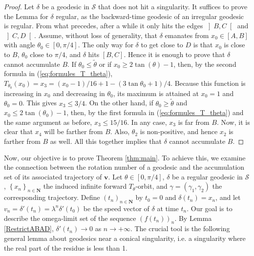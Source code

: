 \documentclass[11pt]{article}
\begin{document}
\begin{proof}
    Let $\delta$ be a geodesic in $\mathcal{S}$ that does not hit a singularity. It suffices to prove the Lemma for $\delta$ regular, as the backward-time geodesic of an irregular geodesic is regular. From what precedes, after a while it only hits the edges $\left]B,C\right[$ and $\left]C,D\right[$. Assume, without loss of generality, that $\delta$ emanates from $x_{0}\in[A,B]$ with angle $\theta_{0}\in[0,\pi/4]$. The only way for $\delta$ to get close to $D$ is that $x_{0}$ is close to $B$, $\theta_{0}$ close to $\pi/4$, and $\delta$ hits $[B,C]$. Hence it is enough to prove that $\delta$ cannot accumulate $B$. If $\theta_{0}\leq\widetilde{\theta}$ or if $x_{0}\geq2\tan(\theta)-1$, then, by the second formula in (\ref{eq:formules_T_theta}), $T_{\theta_{0}}(x_{0})=x_{3}=(x_{0}-1)/16+1-(3\tan\theta_{0}+1)/4$. Because this function is increasing in $x_{0}$ and decreasing in $\theta_{0}$, its maximum is attained at $x_{0}=1$ and $\theta_{0}=0$. This gives $x_{3}\leq3/4$. On the other hand, if $\theta_{0}\geq\widetilde{\theta}$ and $x_{0}\leq2\tan(\theta_{0})-1$, then, by the first formula in (\ref{eq:formules_T_theta}) and the same argument as before, $x_{3}\leq15/16$. In any case, $x_{3}$ is far from $B$. Now, it is clear that $x_{4}$ will be farther from $B$. Also, $\theta_{2}$ is non-positive, and hence $x_{2}$ is farther from $B$ as well. All this together implies that $\delta$ cannot accumulate $B$.
\end{proof}

Now, our objective is to prove Theorem \ref{thm:main}. To achieve this, we examine the connection between the rotation number of a geodesic and the accumulation set of its associated trajectory of $\mathbf{v}$. Let $\theta\in[0,\pi/4]$, $\delta$ be a regular geodesic in $\mathcal{S}$, $\left\{x_{n}\right\}_{n\in\mathbf{N}}$ the induced infinite forward $T_{\theta}$-orbit, and $\gamma=(\gamma_{1},\gamma_{2})$ the corresponding trajectory. Define $\left(t_{n}\right)_{n\in\mathbf{N}}$ by $t_{0}=0$ and $\delta(t_{n})=x_{n}$, and let $v_{n}=\delta'(t_{n})=\lambda^{n}\delta'(t_{0})$ be the speed vector of $\delta$ at time $t_{n}$. Our goal is to describe the omega-limit set of the sequence $(f(t_{n}))_{n}$. By Lemma \ref{RestrictABAD}, $\delta'(t_{n})\rightarrow0$ as $n\rightarrow+\infty$. The crucial tool is the following general lemma about geodesics near a conical singularity, i.e. a singularity where the real part of the residue is less than 1.
\end{document}
